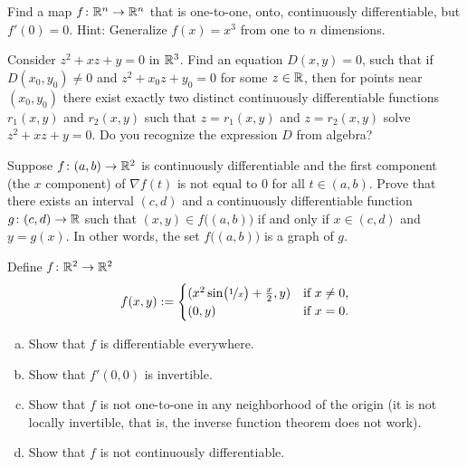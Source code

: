 \begin{exercise}
Find a map $f \colon {\mathbb{R}}^n \to {\mathbb{R}}^n$ that is one-to-one, onto,
continuously differentiable, but $f'(0) = 0$.  Hint: Generalize $f(x) = x^3$ from one
to $n$ dimensions.
\end{exercise}

\begin{exercise}
Consider $z^2 + xz + y =0$ in ${\mathbb{R}}^3$.  Find an equation $D(x,y)=0$, such that
if $D(x_0,y_0) \not= 0$ and $z^2+x_0z+y_0 = 0$ for some $z \in {\mathbb{R}}$,
then for points near $(x_0,y_0)$ there exist
exactly two distinct continuously differentiable functions $r_1(x,y)$
and $r_2(x,y)$ such that $z=r_1(x,y)$ and $z=r_2(x,y)$ solve
$z^2 + xz + y =0$.  Do you recognize the expression $D$ from algebra?
\end{exercise}


\begin{exercise}
Suppose $f \colon (a,b) \to {\mathbb{R}}^2$ is continuously differentiable and
the first component (the $x$ component) of $\nabla f(t)$ is not equal to 0
for all $t \in (a,b)$.
Prove that there exists an interval $(c,d)$ and
a continuously differentiable function $g \colon (c,d) \to {\mathbb{R}}$
such that 
$(x,y) \in f\bigl((a,b)\bigr)$ if and only if $x \in (c,d)$ and $y=g(x)$.
In other words, the set
$f\bigl((a,b)\bigr)$ is a graph of $g$.
\end{exercise}

\begin{samepage}
\begin{exercise}
Define $f \colon {\mathbb{R}}^2 \to {\mathbb{R}}^2$
\begin{equation*}
f(x,y) :=
\begin{cases}
(x^2 \sin \bigl(\nicefrac{1}{x}\bigr) + \frac{x}{2} , y ) & \text{if $x \not= 0$,} \\
(0,y) & \text{if $x=0$.}
\end{cases}
\end{equation*}
\begin{enumerate}[a)]
\item
Show that $f$ is differentiable everywhere.
\item
Show that $f'(0,0)$ is invertible.
\item
Show that $f$ is not one-to-one in any neighborhood of the origin (it is
not locally invertible, that is, the inverse function theorem does not work).
\item
Show that $f$ is not continuously differentiable.
\end{enumerate}
\end{exercise}
\end{samepage}

